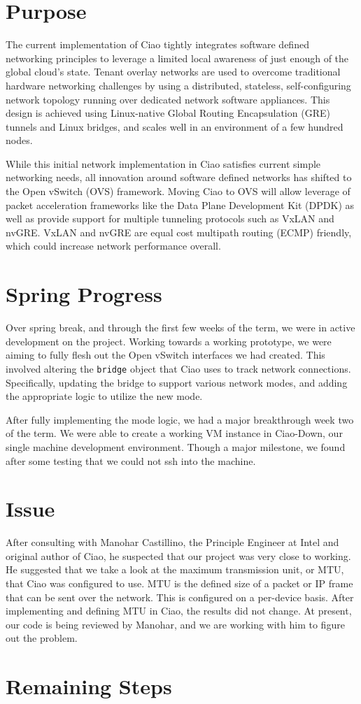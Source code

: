 \documentclass[10pt,onecolumn,journal,draftclsnofoot]{IEEEtran}
\begin{document}
\section{Purpose}

The current implementation of Ciao tightly integrates software defined
networking principles to leverage a limited local awareness of just enough of
the global cloud's state. Tenant overlay networks are used to overcome
traditional hardware networking challenges by using a distributed, stateless,
self-configuring network topology running over dedicated network software
appliances. This design is achieved using Linux-native Global Routing
Encapsulation (GRE) tunnels and Linux bridges, and scales well in an environment
of a few hundred nodes.

While this initial network implementation in Ciao satisfies current simple
networking needs, all innovation around software defined networks has
shifted to the Open vSwitch (OVS) framework. Moving Ciao to OVS will allow
leverage of packet acceleration frameworks like the Data Plane Development Kit
(DPDK) as well as provide support for multiple tunneling protocols such as VxLAN
and nvGRE. VxLAN and nvGRE are equal cost multipath routing (ECMP) friendly,
which could increase network performance overall.

\section{Spring Progress}
Over spring break, and through the first few weeks of the term, we were in active
development on the project. Working towards a working prototype, we were aiming
to fully flesh out the Open vSwitch interfaces we had created. This involved 
altering the \texttt{bridge} object that Ciao uses to track network connections.
Specifically, updating the bridge to support various network modes, and adding
the appropriate logic to utilize the new mode.

After fully implementing the mode logic, we had a major breakthrough week two
of the term. We were able to create a working VM instance in Ciao-Down,
our single machine development environment. Though a major milestone, we found
after some testing that we could not ssh into the machine.


\section{Issue}
After consulting with Manohar Castillino, the Principle Engineer at Intel and
original author of Ciao, he suspected that our project was very close to working.
He suggested that we take a look at the maximum transmission unit, or MTU, that
Ciao was configured to use. MTU is the defined size of a packet or IP frame
that can be sent over the network.\cite{MTU} This is configured on a per-device
basis. After implementing and defining MTU in Ciao, the results did not change.
At present, our code is being reviewed by Manohar, and we are working with him
to figure out the problem. 


\section{Remaining Steps}



\end{document}
